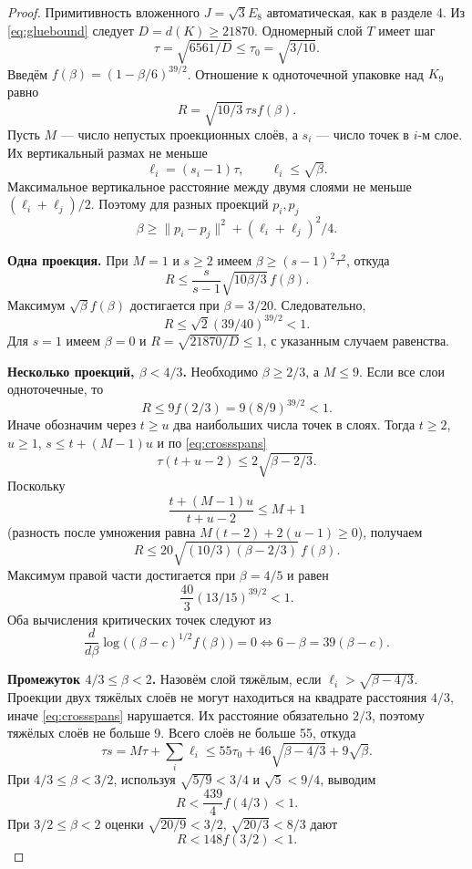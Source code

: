 \documentclass[11pt,a4paper]{article}
\theoremstyle{remark}\newtheorem{remark}[theorem]{Замечание}
\begin{document}
\begin{proof}
Примитивность вложенного $J=\sqrt3E_8$ автоматическая, как в разделе 4. Из \eqref{eq:gluebound} следует $D=d(K)\ge21870$. Одномерный слой $T$ имеет шаг
\[
\tau=\sqrt{6561/D}\le\tau_0=\sqrt{3/10}.
\]
Введём $f(\beta)=(1-\beta/6)^{39/2}$. Отношение к одноточечной упаковке над $K_9$ равно
\begin{equation}\label{eq:familyratio}
R=\sqrt{10/3}\,\tau s f(\beta).
\end{equation}
Пусть $M$ --- число непустых проекционных слоёв, а $s_i$ --- число точек в $i$-м слое. Их вертикальный размах не меньше
\[
\ell_i=(s_i-1)\tau,\qquad \ell_i\le\sqrt\beta.
\]
Максимальное вертикальное расстояние между двумя слоями не меньше $(\ell_i+\ell_j)/2$. Поэтому для разных проекций $p_i,p_j$
\begin{equation}\label{eq:crossspans}
\beta\ge\|p_i-p_j\|^2+(\ell_i+\ell_j)^2/4.
\end{equation}

\textbf{Одна проекция.} При $M=1$ и $s\ge2$ имеем $\beta\ge(s-1)^2\tau^2$, откуда
\[
R\le\frac{s}{s-1}\sqrt{10\beta/3}\,f(\beta).
\]
Максимум $\sqrt\beta f(\beta)$ достигается при $\beta=3/20$. Следовательно,
\[
R\le\sqrt2(39/40)^{39/2}<1.
\]
Для $s=1$ имеем $\beta=0$ и $R=\sqrt{21870/D}\le1$, с указанным случаем равенства.

\textbf{Несколько проекций, $\beta<4/3$.} Необходимо $\beta\ge2/3$, а $M\le9$. Если все слои одноточечные, то
\[
R\le9f(2/3)=9(8/9)^{39/2}<1.
\]
Иначе обозначим через $t\ge u$ два наибольших числа точек в слоях. Тогда $t\ge2$, $u\ge1$, $s\le t+(M-1)u$ и по \eqref{eq:crossspans}
\[
\tau(t+u-2)\le2\sqrt{\beta-2/3}.
\]
Поскольку
\[
\frac{t+(M-1)u}{t+u-2}\le M+1
\]
(разность после умножения равна $M(t-2)+2(u-1)\ge0$), получаем
\[
R\le20\sqrt{(10/3)(\beta-2/3)}\,f(\beta).
\]
Максимум правой части достигается при $\beta=4/5$ и равен
\[
\frac{40}{3}(13/15)^{39/2}<1.
\]
Оба вычисления критических точек следуют из
\[
\frac{d}{d\beta}\log\big((\beta-c)^{1/2}f(\beta)\big)=0
\Longleftrightarrow 6-\beta=39(\beta-c).
\]

\textbf{Промежуток $4/3\le\beta<2$.} Назовём слой тяжёлым, если $\ell_i>\sqrt{\beta-4/3}$. Проекции двух тяжёлых слоёв не могут находиться на квадрате расстояния $4/3$, иначе \eqref{eq:crossspans} нарушается. Их расстояние обязательно $2/3$, поэтому тяжёлых слоёв не больше 9. Всего слоёв не больше 55, откуда
\[
\tau s=M\tau+\sum_i\ell_i
\le55\tau_0+46\sqrt{\beta-4/3}+9\sqrt\beta.
\]
При $4/3\le\beta<3/2$, используя $\sqrt{5/9}<3/4$ и $\sqrt5<9/4$, выводим
\[
R<\frac{439}{4}f(4/3)<1.
\]
При $3/2\le\beta<2$ оценки $\sqrt{20/9}<3/2$, $\sqrt{20/3}<8/3$ дают
\[
R<148f(3/2)<1.
\]


\end{proof}
\end{document}
